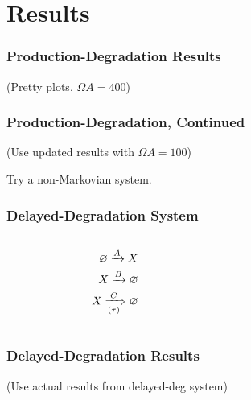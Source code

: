 \documentclass[xcolor={usenames,dvipsnames,svgnames}]{beamer}
\begin{document}

\section{Results}

\begin{frame}
    \frametitle{Production-Degradation Results}
    (Pretty plots, $\Omega A = 400$)
\end{frame}

\begin{frame}
    \frametitle{Production-Degradation, Continued}
    (Use updated results with $\Omega A = 100$)
    \begin{center}
        \resizebox{0.48\textwidth}{!}{
            
        }
        \resizebox{0.48\textwidth}{!}{
            
        }
    \end{center}

    \pause
    Try a non-Markovian system.
\end{frame}

\begin{frame}
    \frametitle{Delayed-Degradation System}
    \begin{columns}[c]
        \begin{column}{0.5\textwidth}
            \begin{align*}
                \varnothing \xrightarrow{A} X \\
                X \xrightarrow{B} \varnothing \\
                X \xRightarrow[(\tau)]{C} \varnothing
            \end{align*}
        \end{column}
        \begin{column}{0.5\textwidth}
            \begin{center}
                \resizebox{\textwidth}{!}{
                    
                }
            \end{center}
        \end{column}
    \end{columns}
\end{frame}

\begin{frame}
    \frametitle{Delayed-Degradation Results}
    (Use actual results from delayed-deg system)
    \begin{center}
        \resizebox{0.48\textwidth}{!}{
            
        }
        \resizebox{0.48\textwidth}{!}{
            
        }
    \end{center}
\end{frame}
\end{document}
